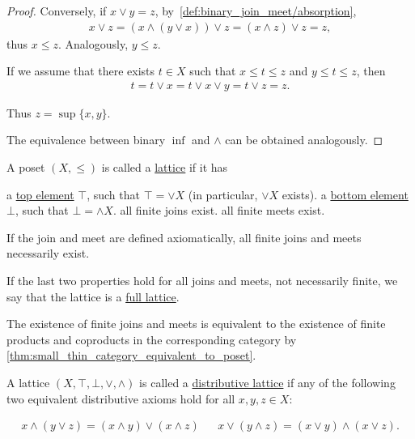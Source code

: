 \begin{proof}
  Conversely, if $x \lor y = z$, by~\ref{def:binary_join_meet/absorption},
  \begin{align*}
    x \lor z = (x \land (y \lor x)) \lor z = (x \land z) \lor z = z,
  \end{align*}
  thus $x \leq z$. Analogously, $y \leq z$.

  If we assume that there exists $t \in X$ such that $x \leq t \leq z$ and $y \leq t \leq z$, then
  \begin{align*}
    t = t \lor x = t \lor x \lor y = t \lor z = z.
  \end{align*}

  Thus $z = \sup \{ x, y \}$.

  The equivalence between binary $\inf$ and $\land$ can be obtained analogously.
\end{proof}

\begin{definition}\label{def:lattice}\cite[28]{Lectures:general_topology}
  A poset $(X, \leq)$ is called a \uline{lattice} if it has
  \begin{description}
     a \uline{top element} $\top$, such that $\top = \lor X$ (in particular, $\lor X$ exists).
     a \uline{bottom element} $\bot$, such that $\bot = \land X$.
     all finite joins exist.
     all finite meets exist.
  \end{description}

  If the join and meet are defined axiomatically, all finite joins and meets necessarily exist.

  If the last two properties hold for all joins and meets, not necessarily finite, we say that the lattice is a \uline{full lattice}.
\end{definition}

\begin{note}\label{def:lattice_categorical_product}
  The existence of finite joins and meets is equivalent to the existence of finite products and coproducts in the corresponding category by \cref{thm:small_thin_category_equivalent_to_poset}.
\end{note}

\begin{definition}\label{def:distributive_lattice}\cite{nLab:distributive_lattice}
  A lattice $(X, \top, \bot, \lor, \land)$ is called a \uline{distributive lattice} if any of the following two equivalent distributive axioms hold for all $x, y, z \in X$:
  \begin{description}
    \begin{align*}
      x \land (y \lor z) = (x \land y) \lor (x \land z)
      &&
      x \lor (y \land z) = (x \lor y) \land (x \lor z).
    \end{align*}
  \end{description}
\end{definition}

